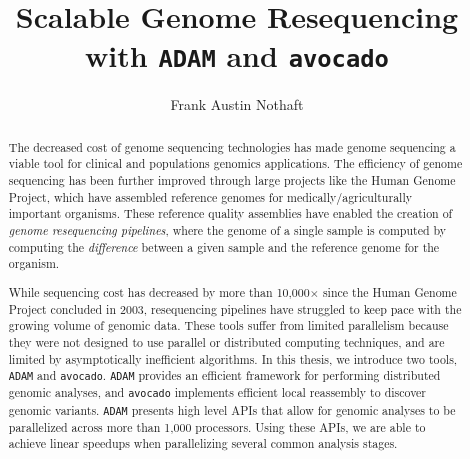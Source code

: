 \documentclass[masters]{ucbthesis}
\begin{document}
\title{Scalable Genome Resequencing with \texttt{ADAM} and \texttt{avocado}}
\author{Frank Austin Nothaft}

\maketitle

\approvalpage
\copyrightpage

\begin{abstract}
The decreased cost of genome sequencing technologies has made genome sequencing a viable
tool for clinical and populations genomics applications. The efficiency of genome sequencing has
been further improved through large projects like the Human Genome Project, which have assembled
reference genomes for medically/agriculturally important organisms. These reference quality assemblies
have enabled the creation of \emph{genome resequencing pipelines}, where the genome of a single
sample is computed by computing the \emph{difference} between a given sample and the reference
genome for the organism.

While sequencing cost has decreased by more than 10,000$\times$ since the Human Genome Project
concluded in 2003, resequencing pipelines have struggled to keep pace with the growing volume of
genomic data. These tools suffer from limited parallelism because they were not designed to use parallel
or distributed computing techniques, and are limited by asymptotically inefficient algorithms. In this thesis,
we introduce two tools, \texttt{ADAM} and \texttt{avocado}. \texttt{ADAM} provides an efficient framework
for performing distributed genomic analyses, and \texttt{avocado} implements efficient local reassembly
to discover genomic variants. \texttt{ADAM} presents high level APIs that allow for genomic analyses to be
parallelized across more than 1,000 processors. Using these APIs, we are able to achieve linear speedups when
parallelizing several common analysis stages.
\end{abstract}
\end{document}
